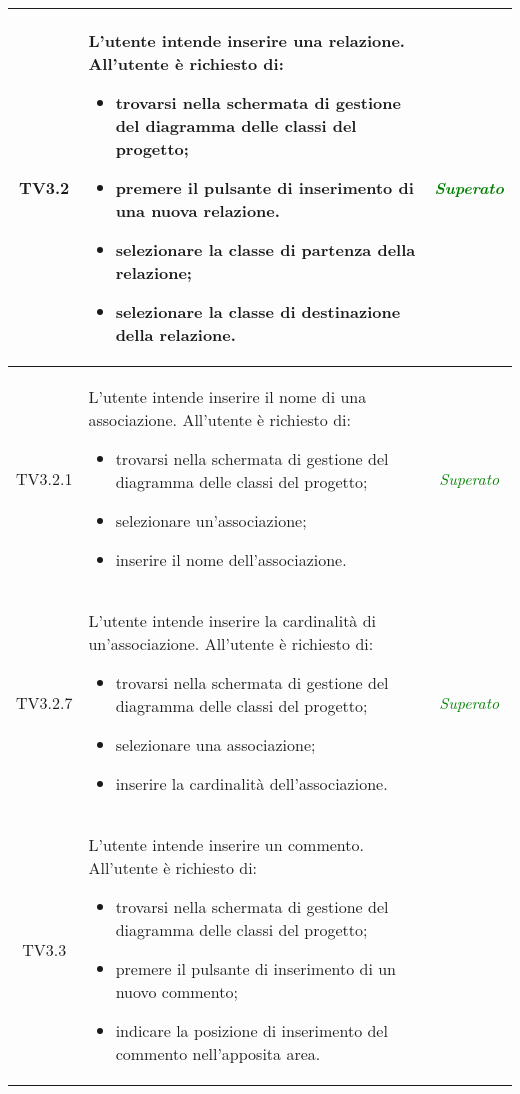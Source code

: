 \begin{longtable}{|c|>{}m{8cm}|c|}
\hypertarget{TV3.2}{TV3.2} & L'utente intende inserire una relazione.
All'utente è richiesto di:
\begin{itemize}
	\item trovarsi nella schermata di gestione del diagramma delle classi del progetto;
	\item premere il pulsante di inserimento di una nuova relazione.
	\item selezionare la classe di partenza della relazione;
	\item selezionare la classe di destinazione della relazione.
\end{itemize} & \textcolor{Green}{\textit{Superato}}\\ \hline

\hypertarget{TV3.2.1}{TV3.2.1} & L'utente intende inserire il nome di una associazione.
All'utente è richiesto di:
\begin{itemize}
	\item trovarsi nella schermata di gestione del diagramma delle classi del progetto;
	\item selezionare un'associazione;
	\item inserire il nome dell'associazione.
\end{itemize} & \textcolor{Green}{\textit{Superato}}\\ \hline

\hypertarget{TV3.2.7}{TV3.2.7} & L'utente intende inserire la cardinalità di un'associazione.
All'utente è richiesto di:
\begin{itemize}
	\item trovarsi nella schermata di gestione del diagramma delle classi del progetto;
	\item selezionare una associazione;
	\item inserire la cardinalità dell'associazione.
\end{itemize} & \textcolor{Green}{\textit{Superato}}\\ \hline

\hypertarget{TV3.3}{TV3.3} & L'utente intende inserire un commento. 
All'utente è richiesto di: 
\begin{itemize} 
	\item trovarsi nella schermata di gestione del diagramma delle classi del progetto;
	\item premere il pulsante di inserimento di un nuovo commento;
	\item indicare la posizione di inserimento del commento nell'apposita area.
	
	
	

\end{itemize}
\end{longtable}
